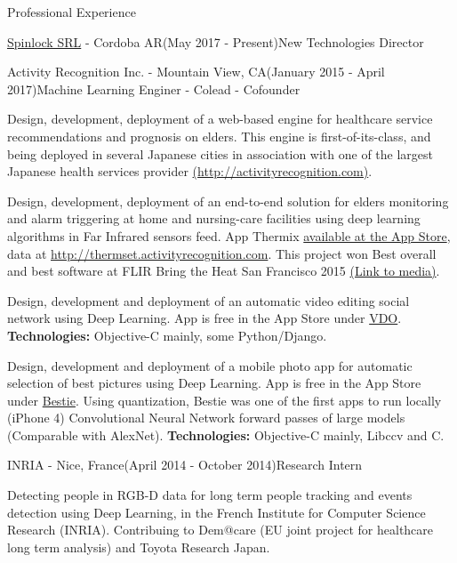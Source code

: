 \documentclass{resume}
\begin{document}
\begin{rSection}{Professional Experience}
\begin{rSubsection}{\href{https://spinlock.com.ar}{Spinlock SRL} - Cordoba AR}{(May 2017 - Present)}{New Technologies Director}{}
\begin{rSubsection}{Activity Recognition Inc. - Mountain View, CA}{(January 2015 - April 2017)}{Machine Learning Enginer - Colead - Cofounder}{}
\item  Design, development, deployment of a web-based engine for healthcare
	service recommendations and prognosis on elders. This engine is first-of-its-class, and being deployed in several Japanese cities in association with one of the largest Japanese health services provider \href{https://maia.care}{({http://activityrecognition.com)}}.
\\
\item Design, development, deployment of an end-to-end solution for elders
monitoring and alarm triggering at home and nursing-care facilities using deep learning algorithms
in Far Infrared sensors feed. App Thermix \href{https://apps.apple.com/us/app/thermix-for-flir-one/id1042703406}{available at the App Store}, data at
\href{http://thermset.activityrecognition.com}{http://thermset.activityrecognition.com}. This project won Best overall and best
software at FLIR Bring the Heat San Francisco 2015 \href{https://developer.flir.com/past-developer-events/san-francisco-2015-bring-the-heat-hacker-maker-challenge-report/}{(Link to media)}.
\\
\item Design, development and deployment of an automatic video editing social network using Deep Learning. App is free in the App Store under \href{https://itunes.apple.com/tz/app/vdo-share-videos-friends-groups/id971211565?mt=8#}{VDO}. {\bf Technologies:} Objective-C mainly, some Python/Django.
\\

\item Design, development and deployment of a mobile photo app for automatic selection of best pictures using Deep Learning. App is free in the App Store under \href{https://apps.apple.com/us/app/bestie-automatic-camera-and-filters-for-selfies/id953752073}{Bestie}. Using quantization, Bestie was one of the first apps to run locally (iPhone 4) Convolutional Neural Network forward passes of large models (Comparable with AlexNet). {\bf Technologies:} Objective-C mainly, Libccv and C.


\end{rSubsection}

\begin{rSubsection}{INRIA - Nice, France}{(April 2014 - October 2014)}{Research Intern}{}
\item Detecting people in RGB-D data for long term people tracking and events detection using Deep Learning, in the French Institute for Computer Science Research (INRIA). Contribuing to Dem@care (EU joint project for healthcare long term analysis) and Toyota Research Japan.
\end{rSubsection}


\end{rSubsection}
\end{rSection}
\end{document}
